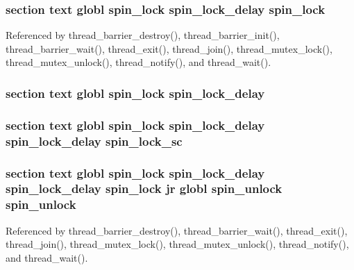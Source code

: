 \hypertarget{mips_2atomic_8S_abff7230a2ee820f538a2574ee5b3a593}{
\subsubsection[{spin\-\_\-lock}]{\setlength{\rightskip}{0pt plus 5cm}section text globl spin\-\_\-lock {\bf spin\-\_\-lock\-\_\-delay} spin\-\_\-lock}}\label{mips_2atomic_8S_abff7230a2ee820f538a2574ee5b3a593}


Referenced by thread\-\_\-barrier\-\_\-destroy(), thread\-\_\-barrier\-\_\-init(), thread\-\_\-barrier\-\_\-wait(), thread\-\_\-exit(), thread\-\_\-join(), thread\-\_\-mutex\-\_\-lock(), thread\-\_\-mutex\-\_\-unlock(), thread\-\_\-notify(), and thread\-\_\-wait().

\hypertarget{mips_2atomic_8S_ac58f8c5ceac726ecc3bcc7f0360b5cfa}{
\subsubsection[{spin\-\_\-lock\-\_\-delay}]{\setlength{\rightskip}{0pt plus 5cm}section text globl {\bf spin\-\_\-lock} spin\-\_\-lock\-\_\-delay}}\label{mips_2atomic_8S_ac58f8c5ceac726ecc3bcc7f0360b5cfa}
\hypertarget{mips_2atomic_8S_a7a7f51dd8dea9bb1a88d2d7fd5e793f2}{
\subsubsection[{spin\-\_\-lock\-\_\-sc}]{\setlength{\rightskip}{0pt plus 5cm}section text globl {\bf spin\-\_\-lock} {\bf spin\-\_\-lock\-\_\-delay} {\bf spin\-\_\-lock\-\_\-delay} spin\-\_\-lock\-\_\-sc}}\label{mips_2atomic_8S_a7a7f51dd8dea9bb1a88d2d7fd5e793f2}
\hypertarget{mips_2atomic_8S_a18d39a883be260c78529672999549545}{
\subsubsection[{spin\-\_\-unlock}]{\setlength{\rightskip}{0pt plus 5cm}section text globl {\bf spin\-\_\-lock} {\bf spin\-\_\-lock\-\_\-delay} {\bf spin\-\_\-lock\-\_\-delay} {\bf spin\-\_\-lock} jr globl spin\-\_\-unlock spin\-\_\-unlock}}\label{mips_2atomic_8S_a18d39a883be260c78529672999549545}


Referenced by thread\-\_\-barrier\-\_\-destroy(), thread\-\_\-barrier\-\_\-wait(), thread\-\_\-exit(), thread\-\_\-join(), thread\-\_\-mutex\-\_\-lock(), thread\-\_\-mutex\-\_\-unlock(), thread\-\_\-notify(), and thread\-\_\-wait().

